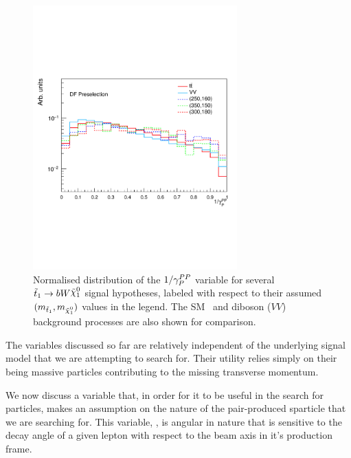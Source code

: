 \begin{figure}[!htb]
    \begin{center}
        \includegraphics[width=0.7\textwidth]{figures/search_stop2l/strategy/comp_plots/dfpresel_gamInvRP1}
        \caption{
            Normalised distribution of the $1/\gamma_P^{PP}$ variable for several $\stopone \rightarrow b W \ninoone$
            signal hypotheses, labeled with respect to their assumed $(m_{\stopone}, m_{\ninoone})$ values in the
            legend.
            The SM \ttbar~and diboson ($VV$) background processes are also shown for comparison.
        }
        \label{fig:rjr_gaminv}
    \end{center}
\end{figure}

The variables discussed so far are relatively independent of the underlying signal model
that we are attempting to search for.
Their utility relies simply on their being massive particles contributing to the missing
transverse momentum.

We now discuss a variable that, in order for it to be useful in the search for \stopone particles,
makes an assumption on the nature of the pair-produced sparticle that we are
searching for.
This variable, \cosb, is angular in nature that is sensitive to the decay angle of a given lepton with
respect to the beam axis in it's production frame.

